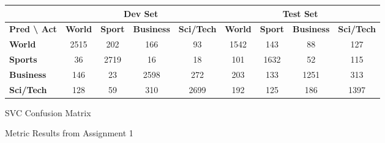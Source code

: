 \documentclass[12pt,a4paper,english]{article}
\begin{document}
\begin{figure}[htbp]
    \vspace{0.6cm}

    \begin{subtable}[b]{1\textwidth}
        \centering
        \begin{tabular}{|l|cccc|cccc|}
        \hline
         & \multicolumn{4}{c|}{\textbf{Dev Set}} & \multicolumn{4}{c|}{\textbf{Test Set}} \\ \hline
        \textbf{Pred \textbackslash{} Act} & \textbf{World} & \textbf{Sport} & \textbf{Business} & \textbf{Sci/Tech} & \textbf{World} & \textbf{Sport} & \textbf{Business} & \textbf{Sci/Tech} \\ \hline
        \textbf{World}    & 2515 & 202 & 166 & 93  & 1542 & 143 & 88  & 127 \\
        \textbf{Sports}   & 36   & 2719 & 16  & 18  & 101  & 1632 & 52  & 115 \\
        \textbf{Business} & 146  & 23   & 2598 & 272 & 203  & 133  & 1251 & 313 \\
        \textbf{Sci/Tech} & 128  & 59   & 310  & 2699 & 192  & 125  & 186  & 1397 \\ \hline
        \end{tabular}
        \caption{SVC Confusion Matrix}
        \label{subtab:svc_cm}
    \end{subtable}

    \caption{Metric Results from Assignment 1}
    \label{fig:assignment_1}
\end{figure}

\newpage
\end{document}
